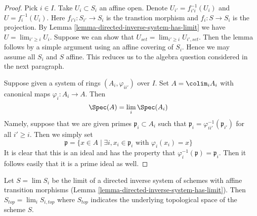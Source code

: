 \begin{proof}
Pick $i \in I$. Take $U_i \subset S_i$ an affine open.
Denote $U_{i'} = f_{i'i}^{-1}(U_i)$ and $U = f_i^{-1}(U_i)$.
Here $f_{i'i} : S_{i'} \to S_i$ is the transtion morphism
and $f_i : S \to S_i$ is the projection.
By Lemma \ref{lemma-directed-inverse-system-has-limit}
we have $U = \lim_{i' \geq i} U_i$.
Suppose we can show that $U_{set} = \lim_{i' \geq i} U_{i', set}$. Then
the lemma follows by a simple argument using an affine covering of $S_i$.
Hence we may assume all $S_i$ and $S$ affine. This reduces us to the
algebra question considered in the next paragraph.

\medskip\noindent
Suppose given a system of rings $(A_i, \varphi_{ii'})$
over $I$. Set $A = \colim_i A_i$ with canonical maps $\varphi_i : A_i \to A$.
Then
$$
\Spec(A) = \lim_i \Spec(A_i)
$$
Namely, suppose that we are given primes $\mathfrak p_i \subset A_i$
such that $\mathfrak p_i = \varphi_{ii'}^{-1}(\mathfrak p_{i'})$
for all $i' \geq i$. Then we simply set
$$
\mathfrak p =
\{x \in A
\mid
\exists i, x_i \in \mathfrak p_i \text{ with }\varphi_i(x_i) = x\}
$$
It is clear that this is an ideal and has the property that
$\varphi_i^{-1}(\mathfrak p) = \mathfrak p_i$. Then it follows
easily that it is a prime ideal as well.
\end{proof}

\begin{lemma}
\label{lemma-inverse-limit-top}
\begin{reference}
\cite[IV, Proposition 8.2.9]{EGA}
\end{reference}
Let $S = \lim S_i$ be the limit of a directed inverse system
of schemes with affine transition morphisms
(Lemma \ref{lemma-directed-inverse-system-has-limit}). Then
$S_{top} = \lim_i S_{i, top}$ where $S_{top}$
indicates the underlying topological space of the scheme $S$.
\end{lemma}

